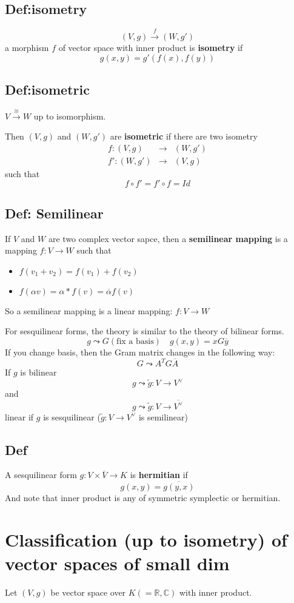\documentclass{book}
\begin{document}
\section{Def:isometry}
$$(V,g)\stackrel{f}\rightarrow(W,g')$$
a morphism $f$ of vector space with inner product is \textbf{isometry} if $$g(x,y)=g'(f(x),f(y))$$
\section{Def:isometric}
$V\stackrel{\cong}\rightarrow W$ up to isomorphism.

Then $(V,g)$ and $(W,g')$ are \textbf{isometric} if there are two isometry
$$\begin{aligned}
    f:(V,g)&\rightarrow&(W,g')\\
    f':(W,g')&\rightarrow&(V,g)
\end{aligned}$$
such that
$$f\circ f'=f'\circ f=Id$$
\section{Def: Semilinear}
If $V$ and $W$ are two complex vector sapce, then a \textbf{semilinear mapping} is a mapping $f:V\rightarrow W$ such that
\begin{itemize}
    \item $f(v_1+v_2)=f(v_1)+f(v_2)$
    \item $f(\alpha v)=\alpha*f(v)=\overline{\alpha}f(v)$
\end{itemize}
So a semilinear mapping is a linear mapping: $f:V\rightarrow W$

For sesquilinear forms, the theory is similar to the theory of bilinear forms.
$$g\leadsto G(\text{fix a basis})\quad g(x,y)=xG\overline{y}$$
If you change basis, then the Gram matrix changes in the following way:
$$G\leadsto A^TG\overline{A}$$
If $g$ is bilinear
$$g\leadsto \tilde{g}:V\rightarrow V^\vee$$
and $$g\leadsto\tilde{g}:V\rightarrow\overline{V^\vee}$$
linear if $g$ is sesquilinear ($\tilde{g}:V\rightarrow V^\vee$ is semilinear)
\section{Def}
A sesquilinear form $g:V\times \overline{V}\rightarrow K$ is \textbf{hermitian} if
$$g(x,y)=\overline{g(y,x)}$$
And note that inner product is any of symmetric symplectic or hermitian.

\chapter{Classification (up to isometry) of vector spaces of small dim}
Let $(V,g)$ be vector space over $K(=\mathbb{R},\mathbb{C})$ with inner product.
\end{document}
